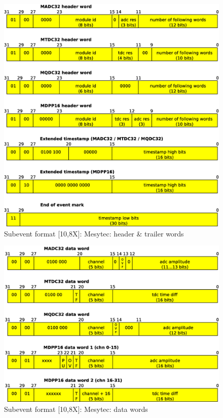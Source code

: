 \documentclass[10pt,a4paper]{article}
\begin{document}
\begin{figure}[H]
\centerline{\includegraphics[width=\linewidth]{MedSevt_Mesytec_2}}
\caption{Subevent format [10,8X]: Mesytec: header \& trailer words}
\label{MedSevt_Mesytec_2}
\end{figure}
\begin{figure}[H]
\centerline{\includegraphics[width=\linewidth]{MedSevt_Mesytec_3}}
\caption{Subevent format [10,8X]: Mesytec: data words}
\label{MedSevt_Mesytec_3}
\end{figure}
\newpage
\end{document}
